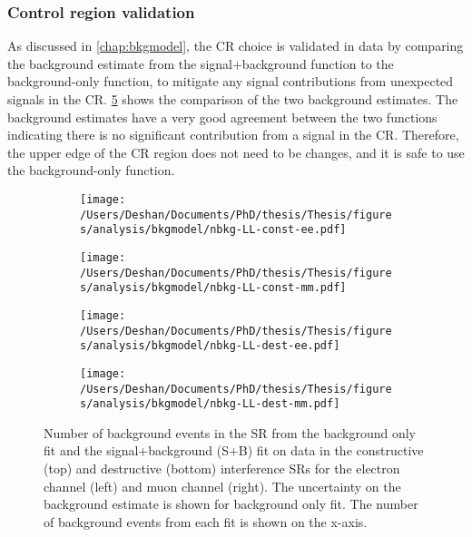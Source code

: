 \subsubsection{Control region validation}
As discussed in \cref{chap:bkgmodel}, the CR choice is validated in data by comparing the background estimate from the signal+background function to the background-only function, to mitigate any signal contributions from unexpected signals in the CR. \cref{fig:results:fitsbplusb} shows the comparison of the two background estimates. The background estimates have a very good agreement between the two functions indicating there is no significant contribution from a signal in the CR. Therefore, the upper edge of the CR region does not need to be changes, and it is safe to use the background-only function. 

\begin{figure}[h!]
    \centering
    \begin{subfigure}[b]{0.49\textwidth}
        \centering
        \texttt{[image: /Users/Deshan/Documents/PhD/thesis/Thesis/figures/analysis/bkgmodel/nbkg-LL-const-ee.pdf]}
        \label{fig:results:fitsbplusb1}
    \end{subfigure}
    \begin{subfigure}[b]{0.49\textwidth}
        \centering
        \texttt{[image: /Users/Deshan/Documents/PhD/thesis/Thesis/figures/analysis/bkgmodel/nbkg-LL-const-mm.pdf]}
        \label{fig:results:fitsbplusb2}
    \end{subfigure}
    \begin{subfigure}[b]{0.49\textwidth}
        \centering
        \texttt{[image: /Users/Deshan/Documents/PhD/thesis/Thesis/figures/analysis/bkgmodel/nbkg-LL-dest-ee.pdf]}
        \label{fig:results:fitsbplusb3}
    \end{subfigure}
    \begin{subfigure}[b]{0.49\textwidth}
        \centering
        \texttt{[image: /Users/Deshan/Documents/PhD/thesis/Thesis/figures/analysis/bkgmodel/nbkg-LL-dest-mm.pdf]}
        \label{fig:results:fitsbplusb4}
    \end{subfigure}
    \caption[Background estimation comparisons of the signal+background fit and background only fit in data]{Number of background events in the SR from the background only fit and the signal+background (S+B) fit on data in the constructive (top) and destructive (bottom) interference SRs for the electron channel (left) and muon channel (right). The uncertainty on the background estimate is shown for background only fit. The number of background events from each fit is shown on the x-axis.}
    \label{fig:results:fitsbplusb}
\end{figure}

